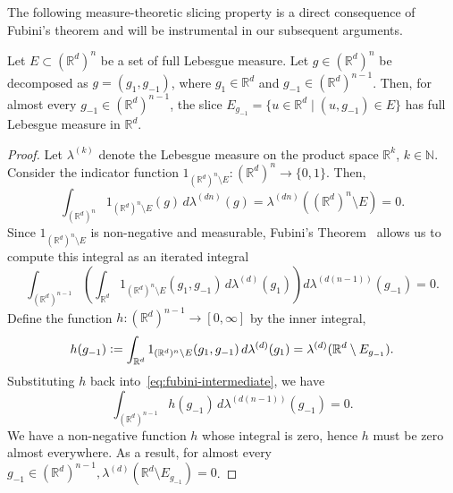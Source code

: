 \documentclass[twoside,11pt]{article}
\newcommand{\R}{\mathbb{R}}
\begin{document}
The following measure-theoretic slicing property is a direct consequence of Fubini’s theorem and will be instrumental in our subsequent arguments.
\begin{lemma}\label{lem:measure-Fubini-slice}
Let $E \subset (\mathbb{R}^d)^n$ be a set of full Lebesgue measure. Let $g \in (\mathbb{R}^d)^n$ be decomposed as $g = (g_1, g_{-1})$, where $g_1 \in \mathbb{R}^d$ and $g_{-1} \in (\mathbb{R}^d)^{n-1}$.
Then, for almost every $g_{-1} \in (\mathbb{R}^d)^{n-1}$, the slice $E_{g_{-1}} = \{ u \in \mathbb{R}^d \mid (u, g_{-1}) \in E \}$ has full Lebesgue measure in $\mathbb{R}^d$.
\end{lemma}
\begin{proof}
Let $\lambda^{(k)}$ denote the Lebesgue measure on the product space $\mathbb{R}^k$, $k\in\mathbb{N}$.
Consider the indicator function $1_{(\mathbb{R}^d)^n \setminus E}: (\mathbb{R}^d)^n \to \{0, 1\}$. Then,
\[
  \int_{(\mathbb{R}^d)^n} 1_{(\mathbb{R}^d)^n \setminus E}(g) \, d\lambda^{(dn)}(g) = \lambda^{(dn)}((\mathbb{R}^d)^n \setminus E) = 0.
\]
Since $1_{(\mathbb{R}^d)^n \setminus E}$ is non-negative and measurable, Fubini's Theorem~\citep[Theorem B.58]{leoni2017first} allows us to compute this integral as an iterated integral
\begin{equation}\label{eq:fubini-intermediate}
  \int_{(\mathbb{R}^d)^{n-1}} \left( \int_{\mathbb{R}^d} 1_{(\mathbb{R}^d)^n \setminus E}(g_1, g_{-1}) \, d\lambda^{(d)}(g_1) \right) d\lambda^{(d(n-1))}(g_{-1}) = 0.
\end{equation}
Define the function $h: (\mathbb{R}^d)^{n-1} \to [0, \infty]$ by the inner integral,
\[
  h(g_{-1}) \vcentcolon= \int_{\mathbb{R}^d} 1_{(\mathbb{R}^d)^n \setminus E}(g_1, g_{-1}) \, d\lambda^{(d)}(g_1) = \lambda^{(d)}(\mathbb{R}^d \setminus E_{g_{-1}}).
\]
Substituting $h$ back into~\eqref{eq:fubini-intermediate}, we have
\[
  \int_{(\mathbb{R}^d)^{n-1}} h(g_{-1}) \, d\lambda^{(d(n-1))}(g_{-1}) = 0.
\]
We have a non-negative function $h$ whose integral is zero, hence $h$ must be zero almost everywhere.
As a result, for almost every $g_{-1} \in (\R^d)^{n-1}, \lambda^{(d)}(\mathbb{R}^d \setminus E_{g_{-1}}) = 0$.
\end{proof}
\end{document}
